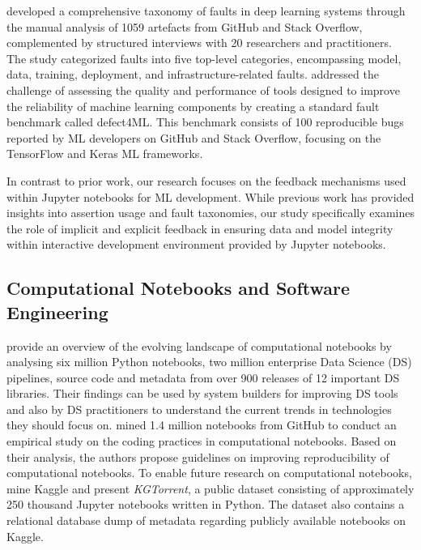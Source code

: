 \documentclass[smallextended]{svjour3}       %
\begin{document}
\citet{humbatova2020taxonomy} developed a comprehensive taxonomy of faults in deep learning systems through the manual analysis of 1059 artefacts from GitHub and Stack Overflow, complemented by structured interviews with 20 researchers and practitioners. The study categorized faults into five top-level categories, encompassing model, data, training, deployment, and infrastructure-related faults. \citet{morovati2023bugs} addressed the challenge of assessing the quality and performance of tools designed to improve the reliability of machine learning components by creating a standard fault benchmark called defect4ML. This benchmark consists of 100 reproducible bugs reported by ML developers on GitHub and Stack Overflow, focusing on the TensorFlow and Keras ML frameworks.

In contrast to prior work, our research focuses on the feedback mechanisms used within Jupyter notebooks for ML development. While previous work has provided insights into assertion usage and fault taxonomies, our study specifically examines the role of implicit and explicit feedback in ensuring data and model integrity within interactive development environment provided by Jupyter notebooks.

\subsection{Computational Notebooks and Software Engineering}\label{sec:notebooks}

\citet{psallidas2019data} provide an overview of the evolving landscape of computational notebooks by analysing six million Python notebooks, two million enterprise Data Science (DS) pipelines, source code and metadata from over 900 releases of 12 important DS libraries. Their findings can be used by system builders for improving DS tools and also by DS practitioners to understand the current trends in technologies they should focus on. \citet{pimentel2019large-scale} mined 1.4 million notebooks from GitHub to conduct an empirical study on the coding practices in computational notebooks. Based on their analysis, the authors propose guidelines on improving reproducibility of computational notebooks. To enable future research on computational notebooks, \citet{quaranta2021kgtorrent} mine Kaggle and present \textit{KGTorrent}, a public dataset consisting of approximately 250 thousand Jupyter notebooks written in Python. The dataset also contains a relational database dump of metadata regarding publicly available notebooks on Kaggle.
\end{document}
